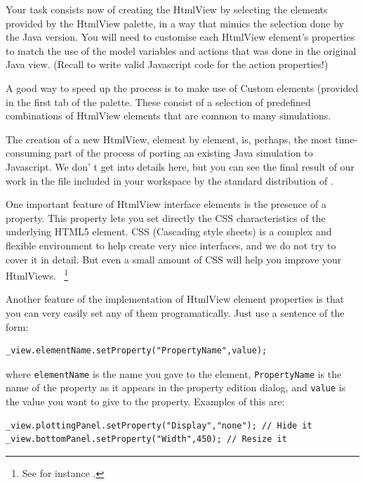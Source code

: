 Your task consists now of creating the HtmlView by selecting the elements provided by the HtmlView palette, in a way that mimics the selection done by the Java version. You will need to customise each HtmlView element's properties to match the use of the model variables and actions that was done in the original Java view. (Recall to write valid Javascript code for the action properties!)

A good way to speed up the process is to make use of Custom elements (provided in the first tab of the  palette. These consist of a selection of predefined combinations of HtmlView elements that are common to many simulations.

The creation of a new HtmlView, element by element, is, perhaps, the most time-consuming part of the process of porting an existing Java simulation to Javascript. We don' t get into details here, but you can see the final result of our work in the  file included in your workspace by the standard distribution of \ejs.

One important feature of HtmlView interface elements is the presence of a  property. This property lets you set directly the CSS characteristics of the underlying HTML5 element. CSS (Cascading style sheets) is a complex and flexible environment to help create very nice interfaces, and we do not try to cover it in detail. But even a small amount of CSS will help you improve your HtmlViews. ~\footnote{See for instance .}

Another feature of the implementation of HtmlView element properties is that you can very easily set any of them programatically. Just use a sentence of the form:
\begin{verbatim}
_view.elementName.setProperty("PropertyName",value);
\end{verbatim}
\noindent where \verb?elementName? is the name you gave to the element, \verb?PropertyName? is the name of the property as it appears in the property edition dialog, and \verb?value? is the value you want to give to the property. Examples of this are:
\begin{verbatim}
_view.plottingPanel.setProperty("Display","none"); // Hide it
_view.bottomPanel.setProperty("Width",450); // Resize it
\end{verbatim}

